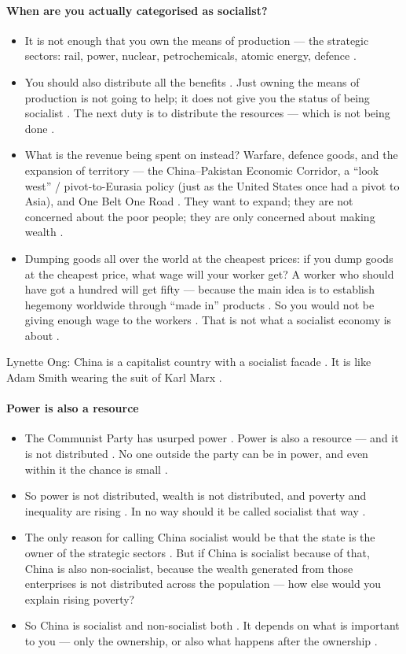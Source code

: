 \paragraph{When are you actually categorised as socialist?}
\begin{itemize}
    \item It is not enough that you own the means of production --- the strategic sectors: rail, power, nuclear, petrochemicals, atomic energy, defence .
    \item You should also distribute all the benefits . Just owning the means of production is not going to help; it does not give you the status of being socialist . The next duty is to distribute the resources --- which is not being done .
    \item What is the revenue being spent on instead? Warfare, defence goods, and the expansion of territory --- the China--Pakistan Economic Corridor, a ``look west'' / pivot-to-Eurasia policy (just as the United States once had a pivot to Asia), and One Belt One Road . They want to expand; they are not concerned about the poor people; they are only concerned about making wealth .
    \item Dumping goods all over the world at the cheapest prices: if you dump goods at the cheapest price, what wage will your worker get? A worker who should have got a hundred will get fifty --- because the main idea is to establish hegemony worldwide through ``made in'' products . So you would not be giving enough wage to the workers . That is not what a socialist economy is about .
\end{itemize}

\begin{KeyConcept}
Lynette Ong: China is a capitalist country with a socialist facade . It is like Adam Smith wearing the suit of Karl Marx .
\end{KeyConcept}

\paragraph{Power is also a resource}
\begin{itemize}
    \item The Communist Party has usurped power . Power is also a resource --- and it is not distributed . No one outside the party can be in power, and even within it the chance is small .
    \item So power is not distributed, wealth is not distributed, and poverty and inequality are rising . In no way should it be called socialist that way .
    \item The only reason for calling China socialist would be that the state is the owner of the strategic sectors . But if China is socialist because of that, China is also non-socialist, because the wealth generated from those enterprises is not distributed across the population --- how else would you explain rising poverty? 
    \item So China is socialist and non-socialist both . It depends on what is important to you --- only the ownership, or also what happens after the ownership .
\end{itemize}

